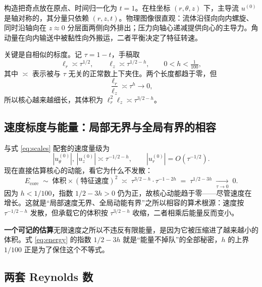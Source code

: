 构造把奇点放在原点、时间归一化为 $t=1$。在柱坐标 $(r,\theta,z)$ 下，主导流 $u^{(0)}$ 是轴对称的，其分量只依赖 $(r,z,t)$。物理图像很直观：流体沿径向向内螺旋、同时沿轴向在 $z\approx0$ 分层面两侧向外排出；压力向轴心递减提供向心的主导力。角动量在向内输送中被黏性向外搬运，二者平衡决定了特征转速。

关键是自相似的标度。记 $\tau=1-t$，手稿取
\begin{equation}
\ell_{r}\asymp\tau^{1/2},\qquad \ell_{z}\asymp\tau^{1/2-h},\qquad 0<h<\tfrac1{100},
\label{eq:scales}
\end{equation}
其中 $\asymp$ 表示被与 $\tau$ 无关的正常数上下夹住。两个长度都趋于零，但
\begin{equation}
\frac{\ell_{r}}{\ell_{z}}\asymp\tau^{h}\to0,
\end{equation}
所以核心越来越细长，其体积为 $\ell_{r}^{2}\ell_{z}\asymp\tau^{3/2-h}$。

\subsection{速度标度与能量：局部无界与全局有界的相容}

与式 \eqref{eq:scales} 配套的速度量级为
\begin{equation}
|u_{\theta}^{(0)}|,\,|u_{z}^{(0)}|\asymp\tau^{-1/2-h},\qquad |u_{r}^{(0)}|=O(\tau^{-1/2}).
\end{equation}
现在直接估算核心的动能，看它为什么不发散：
\begin{equation}
E_{\text{core}}\;\sim\;\text{体积}\times(\text{特征速度})^{2}
\;\asymp\;\tau^{3/2-h}\cdot\tau^{-1-2h}
\;=\;\tau^{1/2-3h}\;\xrightarrow[\tau\to0]{}\;0 .
\label{eq:energy}
\end{equation}
因为 $h<1/100$，指数 $1/2-3h>0$ 仍为正，故核心动能趋于零——尽管速度在增长。这就是“局部速度无界、全局动能有界”之所以相容的算术根源：速度按 $\tau^{-1/2-h}$ 发散，但承载它的体积按 $\tau^{3/2-h}$ 收缩，二者相乘后能量反而变小。

\begin{keybox}
\textbf{一个可记的估算}\quad 无限速度之所以不违反有限能量，是因为它被压缩进了越来越小的体积。式 \eqref{eq:energy} 的指数 $1/2-3h$ 就是“能量不掉队”的全部秘密，$h$ 的上界 $1/100$ 正是为了保住这个不等式。
\end{keybox}

\subsection{两套 Reynolds 数}

